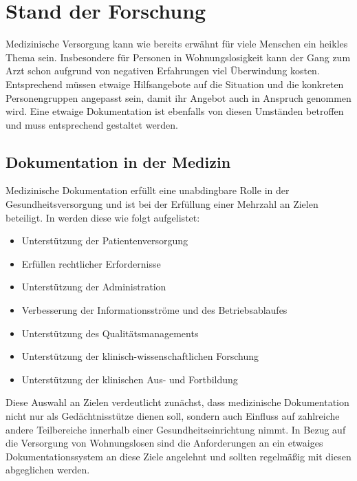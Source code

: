 \chapter{Stand der Forschung}\label{ch:relatedWork}

Medizinische Versorgung kann wie bereits erwähnt für viele Menschen ein heikles Thema sein. Insbesondere für Personen in Wohnungslosigkeit kann der Gang zum Arzt schon aufgrund von negativen Erfahrungen viel Überwindung kosten. Entsprechend müssen etwaige Hilfsangebote auf die Situation und die konkreten Personengruppen angepasst sein, damit ihr Angebot auch in Anspruch genommen wird. Eine etwaige Dokumentation ist ebenfalls von diesen Umständen betroffen und muss entsprechend gestaltet werden.

\section{Dokumentation in der Medizin}

Medizinische Dokumentation erfüllt eine unabdingbare Rolle in der Gesundheitsversorgung und ist bei der Erfüllung einer Mehrzahl an Zielen beteiligt. In \citet{Leiner.2012} werden diese wie folgt aufgelistet:

\begin{itemize}
	\item Unterstützung der Patientenversorgung
	\item Erfüllen rechtlicher Erfordernisse
	\item Unterstützung der Administration
	\item Verbesserung der Informationsströme und des Betriebsablaufes
	\item Unterstützung des Qualitätsmanagements
	\item Unterstützung der klinisch-wissenschaftlichen Forschung
	\item Unterstützung der klinischen Aus- und Fortbildung
\end{itemize}

Diese Auswahl an Zielen verdeutlicht zunächst, dass medizinische Dokumentation nicht nur als Gedächtnisstütze dienen soll, sondern auch Einfluss auf zahlreiche andere Teilbereiche innerhalb einer Gesundheitseinrichtung nimmt. In Bezug auf die Versorgung von Wohnungslosen sind die Anforderungen an ein etwaiges Dokumentationssystem an diese Ziele angelehnt und sollten regelmäßig mit diesen abgeglichen werden.

